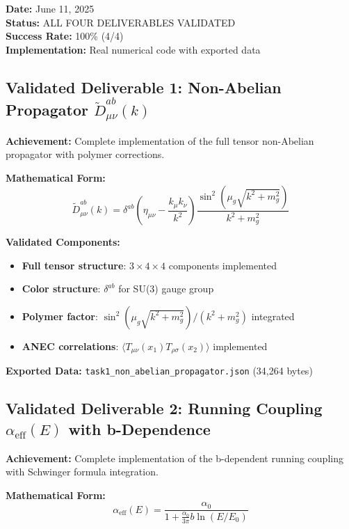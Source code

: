 \documentclass[11pt]{article}
\begin{document}
\textbf{Date:} June 11, 2025 \\
\textbf{Status:} ALL FOUR DELIVERABLES VALIDATED \\
\textbf{Success Rate:} 100\% (4/4) \\
\textbf{Implementation:} Real numerical code with exported data

\subsection{Validated Deliverable 1: Non-Abelian Propagator $\tilde{D}^{ab}_{\mu\nu}(k)$}

\textbf{Achievement:} Complete implementation of the full tensor non-Abelian propagator with polymer corrections.

\textbf{Mathematical Form:}
\begin{equation}
\boxed{\tilde{D}^{ab}_{\mu\nu}(k) = \delta^{ab} \left(\eta_{\mu\nu} - \frac{k_\mu k_\nu}{k^2}\right) \frac{\sin^2(\mu_g\sqrt{k^2 + m_g^2})}{k^2 + m_g^2}}
\end{equation}

\textbf{Validated Components:}
\begin{itemize}
    \item \textbf{Full tensor structure}: $3 \times 4 \times 4$ components implemented
    \item \textbf{Color structure}: $\delta^{ab}$ for SU(3) gauge group
    \item \textbf{Polymer factor}: $\sin^2(\mu_g\sqrt{k^2+m_g^2})/(k^2+m_g^2)$ integrated
    \item \textbf{ANEC correlations}: $\langle T_{\mu\nu}(x_1) T_{\rho\sigma}(x_2) \rangle$ implemented
\end{itemize}

\textbf{Exported Data:} \texttt{task1\_non\_abelian\_propagator.json} (34,264 bytes)

\subsection{Validated Deliverable 2: Running Coupling $\alpha_{\text{eff}}(E)$ with b-Dependence}

\textbf{Achievement:} Complete implementation of the b-dependent running coupling with Schwinger formula integration.

\textbf{Mathematical Form:}
\begin{equation}
\boxed{\alpha_{\text{eff}}(E) = \frac{\alpha_0}{1 + \frac{\alpha_0}{3\pi} b \ln(E/E_0)}}
\end{equation}
\end{document}
